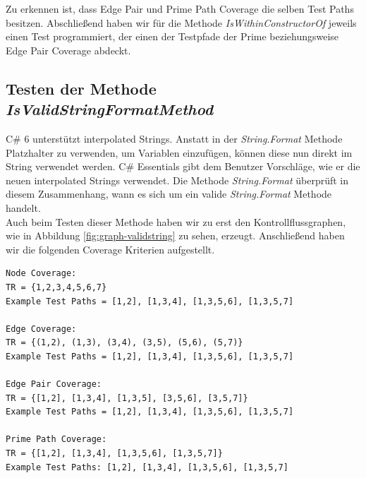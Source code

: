 \vspace{3ex}
Zu erkennen ist, dass Edge Pair und Prime Path Coverage die selben Test Paths besitzen. Abschließend haben wir für die Methode \textit{IsWithinConstructorOf} jeweils einen Test programmiert, der einen der Testpfade der Prime beziehungsweise Edge Pair Coverage abdeckt.


\subsection{Testen der Methode \textit{IsValidStringFormatMethod}}
C\# 6 unterstützt interpolated Strings. Anstatt in der \textit{String.Format} Methode Platzhalter zu verwenden, um Variablen einzufügen, können diese nun direkt im String verwendet werden.\cite{csharp6} C\# Essentials gibt dem Benutzer Vorschläge, wie er die neuen interpolated Strings verwendet. Die Methode \textit{String.Format} überprüft in diesem Zusammenhang, wann es sich um ein valide \textit{String.Format} Methode handelt.\\
Auch beim Testen dieser Methode haben wir zu erst den Kontrollflussgraphen, wie in Abbildung \ref{fig:graph-validstring} zu sehen, erzeugt. Anschließend haben wir die folgenden Coverage Kriterien aufgestellt.
\begin{lstlisting}
Node Coverage:
TR = {1,2,3,4,5,6,7}
Example Test Paths = [1,2], [1,3,4], [1,3,5,6], [1,3,5,7]

Edge Coverage:
TR = {(1,2), (1,3), (3,4), (3,5), (5,6), (5,7)}
Example Test Paths = [1,2], [1,3,4], [1,3,5,6], [1,3,5,7]

Edge Pair Coverage:
TR = {[1,2], [1,3,4], [1,3,5], [3,5,6], [3,5,7]}
Example Test Paths = [1,2], [1,3,4], [1,3,5,6], [1,3,5,7]

Prime Path Coverage:
TR = {[1,2], [1,3,4], [1,3,5,6], [1,3,5,7]}
Example Test Paths: [1,2], [1,3,4], [1,3,5,6], [1,3,5,7]

\end{lstlisting}

